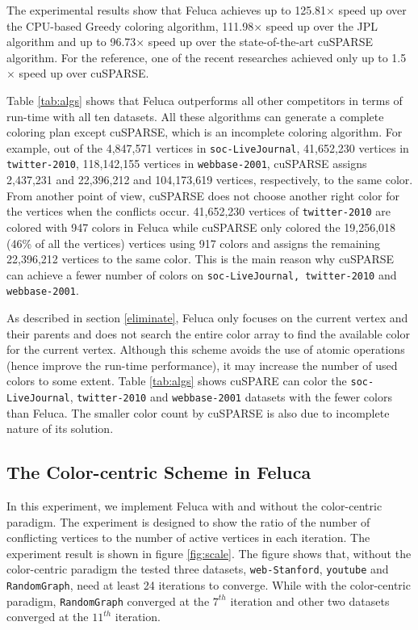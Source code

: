 The experimental results show that Feluca achieves up to 125.81$\times$ speed up over the CPU-based Greedy coloring algorithm, 111.98$\times$ speed up over the JPL algorithm and up to 96.73$\times$ speed up over the state-of-the-art cuSPARSE algorithm. For the reference, one of the recent researches \cite{Manycore} achieved only up to 1.5$\times$ speed up over cuSPARSE. 

Table \ref{tab:algs} shows that Feluca outperforms all other competitors in terms of run-time with all ten datasets. All these algorithms can generate a complete coloring plan except cuSPARSE, which is an incomplete coloring algorithm. For example, out of the 4,847,571 vertices in \texttt{soc-LiveJournal}, 41,652,230 vertices in \texttt{twitter-2010}, 118,142,155 vertices in \texttt{webbase-2001}, cuSPARSE assigns 2,437,231 and 22,396,212 and 104,173,619 vertices, respectively, to the same color. From another point of view, cuSPARSE does not choose another right color for the vertices when the conflicts occur. 41,652,230 vertices of \texttt{twitter-2010} are colored with 947 colors in Feluca while cuSPARSE only colored the 19,256,018 (46\% of all the vertices) vertices  using 917 colors and assigns the remaining 22,396,212 vertices to the same color. This is the main reason why cuSPARSE can achieve a fewer number of colors on \texttt{soc-LiveJournal, twitter-2010} and \texttt{webbase-2001}.

As described in section \ref{eliminate}, Feluca only focuses on the current vertex and their parents and does not search the entire color array to find the available color for the current vertex. Although this scheme avoids the use of atomic operations (hence improve the run-time performance), it may increase the number of used colors to some extent. Table \ref{tab:algs} shows cuSPARE can color the \texttt{soc-LiveJournal}, \texttt{twitter-2010} and \texttt{webbase-2001} datasets with the fewer colors than Feluca. The smaller color count by cuSPARSE is also due to incomplete nature of its solution. 

\subsection{The Color-centric Scheme in Feluca}
\label{perfo}

In this experiment, we implement Feluca with and without the color-centric paradigm. The experiment is designed to show the ratio of the number of conflicting vertices to the number of active vertices in each iteration. The experiment result is shown in figure \ref{fig:scale}. The figure shows that, without the color-centric paradigm the tested three datasets, \texttt{web-Stanford}, \texttt{youtube} and \texttt{RandomGraph}, need at least 24 iterations to converge. While with the color-centric paradigm, \texttt{RandomGraph} converged at the $7^{th}$ iteration and other two datasets converged at the $11^{th}$ iteration.

